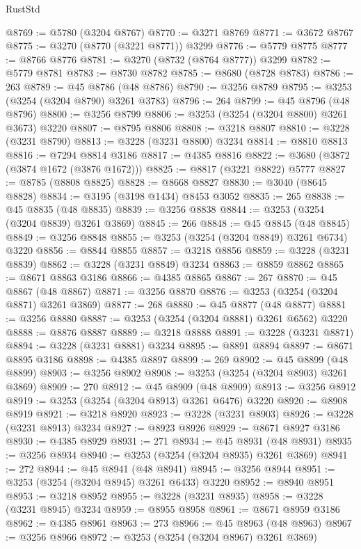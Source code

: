 \begin{lexlean}{RustStd}
\begin{coremodule}
@8769 := @5780 (@3204 @8767)
@8770 := @3271 @8769
@8771 := @3672 @8767
@8775 := @3270 (@8770 (@3221 @8771)) @3299
@8776 := @5779 @8775
@8777 := @8766 @8776
@8781 := @3270 (@8732 (@8764 @8777)) @3299
@8782 := @5779 @8781
@8783 := @8730 @8782
@8785 := @8680 (@8728 @8783)
@8786 := 263
@8789 := @45 @8786 (@48 @8786)
@8790 := @3256 @8789
@8795 := @3253 (@3254 (@3204 @8790) @3261 @3783)
@8796 := 264
@8799 := @45 @8796 (@48 @8796)
@8800 := @3256 @8799
@8806 := @3253 (@3254 (@3204 @8800) @3261 @3673) @3220
@8807 := @8795 @8806
@8808 := @3218 @8807
@8810 := @3228 (@3231 @8790)
@8813 := @3228 (@3231 @8800) @3234
@8814 := @8810 @8813
@8816 := @7294 @8814 @3186
@8817 := @4385 @8816
@8822 := @3680 (@3872 (@3874 @1672 (@3876 @1672)))
@8825 := @8817 (@3221 @8822) @5777
@8827 := @8785 (@8808 @8825)
@8828 := @8668 @8827
@8830 := @3040 (@8645 @8828)
@8834 := @3195 (@3198 @1434) @8453 @3052
@8835 := 265
@8838 := @45 @8835 (@48 @8835)
@8839 := @3256 @8838
@8844 := @3253 (@3254 (@3204 @8839) @3261 @3869)
@8845 := 266
@8848 := @45 @8845 (@48 @8845)
@8849 := @3256 @8848
@8855 := @3253 (@3254 (@3204 @8849) @3261 @6734) @3220
@8856 := @8844 @8855
@8857 := @3218 @8856
@8859 := @3228 (@3231 @8839)
@8862 := @3228 (@3231 @8849) @3234
@8863 := @8859 @8862
@8865 := @8671 @8863 @3186
@8866 := @4385 @8865
@8867 := 267
@8870 := @45 @8867 (@48 @8867)
@8871 := @3256 @8870
@8876 := @3253 (@3254 (@3204 @8871) @3261 @3869)
@8877 := 268
@8880 := @45 @8877 (@48 @8877)
@8881 := @3256 @8880
@8887 := @3253 (@3254 (@3204 @8881) @3261 @6562) @3220
@8888 := @8876 @8887
@8889 := @3218 @8888
@8891 := @3228 (@3231 @8871)
@8894 := @3228 (@3231 @8881) @3234
@8895 := @8891 @8894
@8897 := @8671 @8895 @3186
@8898 := @4385 @8897
@8899 := 269
@8902 := @45 @8899 (@48 @8899)
@8903 := @3256 @8902
@8908 := @3253 (@3254 (@3204 @8903) @3261 @3869)
@8909 := 270
@8912 := @45 @8909 (@48 @8909)
@8913 := @3256 @8912
@8919 := @3253 (@3254 (@3204 @8913) @3261 @6476) @3220
@8920 := @8908 @8919
@8921 := @3218 @8920
@8923 := @3228 (@3231 @8903)
@8926 := @3228 (@3231 @8913) @3234
@8927 := @8923 @8926
@8929 := @8671 @8927 @3186
@8930 := @4385 @8929
@8931 := 271
@8934 := @45 @8931 (@48 @8931)
@8935 := @3256 @8934
@8940 := @3253 (@3254 (@3204 @8935) @3261 @3869)
@8941 := 272
@8944 := @45 @8941 (@48 @8941)
@8945 := @3256 @8944
@8951 := @3253 (@3254 (@3204 @8945) @3261 @6433) @3220
@8952 := @8940 @8951
@8953 := @3218 @8952
@8955 := @3228 (@3231 @8935)
@8958 := @3228 (@3231 @8945) @3234
@8959 := @8955 @8958
@8961 := @8671 @8959 @3186
@8962 := @4385 @8961
@8963 := 273
@8966 := @45 @8963 (@48 @8963)
@8967 := @3256 @8966
@8972 := @3253 (@3254 (@3204 @8967) @3261 @3869)

\end{coremodule}
\end{lexlean}
